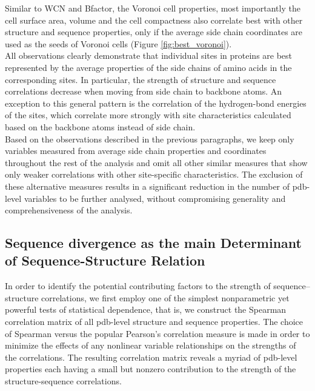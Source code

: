 \documentclass[11pt]{article}
\begin{document}
        Similar to WCN and Bfactor, the Voronoi cell properties, most importantly the cell surface area, volume and the cell compactness also correlate best with other structure and sequence properties, only if the average side chain coordinates are used as the seeds of Voronoi cells (Figure \ref{fig:best_voronoi}).
        \\

        All observations clearly demonstrate that individual sites in proteins are best represented by the average properties of the side chains of amino acids in the corresponding sites. In particular, the strength of structure and sequence correlations decrease when moving from side chain to backbone atoms. An exception to this general pattern is the correlation of the hydrogen-bond energies of the sites, which correlate more strongly with site characteristics calculated based on the backbone atoms instead of side chain.
        \\

        Based on the observations described in the previous paragraphs, we keep only variables measured from average side chain properties and coordinates throughout the rest of the analysis and omit all other similar measures that show only weaker correlations with other site-specific characteristics. The exclusion of these alternative measures results in a significant reduction in the number of pdb-level variables to be further analysed, without compromising generality and comprehensiveness of the analysis.
        \\


    \subsection*{Sequence divergence as the main Determinant of Sequence-Structure Relation}

        In order to identify the potential contributing factors to the strength of sequence--structure correlations, we first employ one of the simplest nonparametric yet powerful tests of statistical dependence, that is, we construct the Spearman correlation matrix of all pdb-level structure and sequence properties. The choice of Spearman versus the popular Pearson's correlation measure is made in order to minimize the effects of any nonlinear variable relationships on the strengths of the correlations.  The resulting correlation matrix reveals a myriad of pdb-level properties each having a small but nonzero contribution to the strength of the structure-sequence correlations.
        \\
\end{document}
